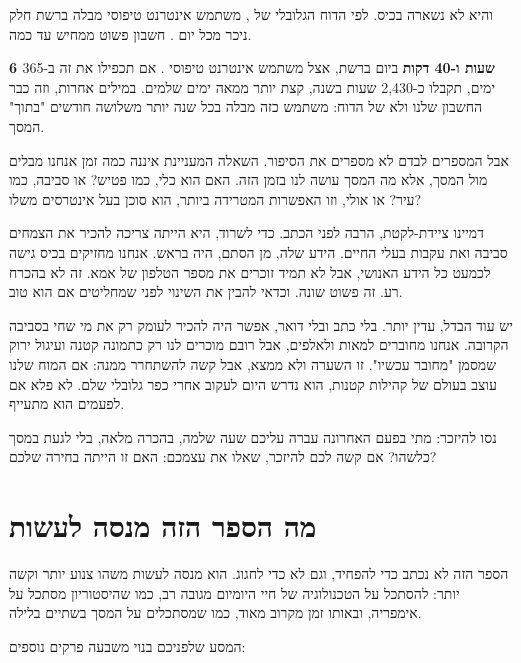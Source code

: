 והיא לא נשארה בכיס. לפי הדוח הגלובלי של , משתמש אינטרנט טיפוסי מבלה ברשת חלק ניכר מכל יום \parencite{kemp2024}. חשבון פשוט ממחיש עד כמה.

\begin{factbox}
\textbf{6 שעות ו-40 דקות} ביום ברשת, אצל משתמש אינטרנט טיפוסי \parencite{kemp2024}. אם תכפילו את זה ב-365 ימים, תקבלו כ-2,430 שעות בשנה, קצת יותר ממאה ימים שלמים. במילים אחרות, וזה כבר החשבון שלנו ולא של הדוח: משתמש כזה מבלה בכל שנה יותר משלושה חודשים "בתוך" המסך.
\end{factbox}

אבל המספרים לבדם לא מספרים את הסיפור. השאלה המעניינת איננה כמה זמן אנחנו מבלים מול המסך, אלא מה המסך עושה לנו בזמן הזה. האם הוא כלי, כמו פטיש? או סביבה, כמו עיר? או אולי, וזו האפשרות המטרידה ביותר, הוא סוכן בעל אינטרסים משלו?

דמיינו ציידת-לקטת, הרבה לפני הכתב. כדי לשרוד, היא הייתה צריכה להכיר את הצמחים סביבה ואת עקבות בעלי החיים. הידע שלה, מן הסתם, היה בראש. אנחנו מחזיקים בכיס גישה לכמעט כל הידע האנושי, אבל לא תמיד זוכרים את מספר הטלפון של אמא. זה לא בהכרח רע. זה פשוט שונה. וכדאי להבין את השינוי לפני שמחליטים אם הוא טוב.

יש עוד הבדל, עדין יותר. בלי כתב ובלי דואר, אפשר היה להכיר לעומק רק את מי שחי בסביבה הקרובה. אנחנו מחוברים למאות ולאלפים, אבל רובם מוכרים לנו רק כתמונה קטנה ועיגול ירוק שמסמן "מחובר עכשיו". זו השערה ולא ממצא, אבל קשה להשתחרר ממנה: אם המוח שלנו עוצב בעולם של קהילות קטנות, הוא נדרש היום לעקוב אחרי כפר גלובלי שלם. לא פלא אם לפעמים הוא מתעייף.

\begin{thinkbox}
נסו להיזכר: מתי בפעם האחרונה עברה עליכם שעה שלמה, בהכרה מלאה, בלי לגעת במסך כלשהו? אם קשה לכם להיזכר, שאלו את עצמכם: האם זו הייתה בחירה שלכם?
\end{thinkbox}

\section{מה הספר הזה מנסה לעשות}

הספר הזה לא נכתב כדי להפחיד, וגם לא כדי לחגוג. הוא מנסה לעשות משהו צנוע יותר וקשה יותר: להסתכל על הטכנולוגיה של חיי היומיום מגובה רב, כמו שהיסטוריון מסתכל על אימפריה, ובאותו זמן מקרוב מאוד, כמו שמסתכלים על המסך בשתיים בלילה.

המסע שלפניכם בנוי משבעה פרקים נוספים:

